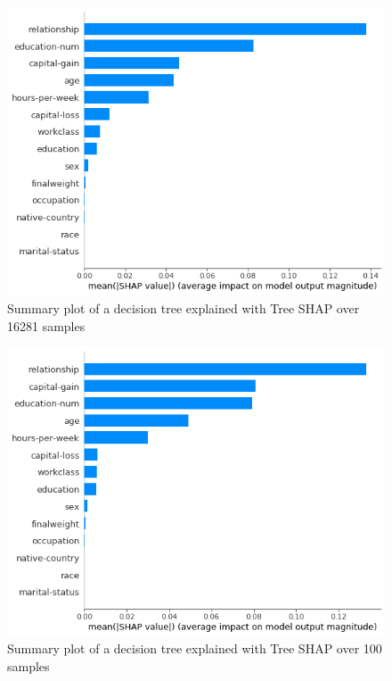 \documentclass[conference]{IEEEtran}
\begin{document}
\begin{figure}[htbp]
\centerline{
	\includegraphics[width=\linewidth]{../fig/ex_02_TreeShap_16281_Samples_SummaryPlot.png}
}
\caption{Summary plot of a decision tree explained with Tree SHAP over 16281 samples}
\label{fig5}
\end{figure}

\begin{figure}[htbp]
\centerline{
	\includegraphics[width=\linewidth]{../fig/ex_02_TreeShap_100_Samples_SummaryPlot.png}
}
\caption{Summary plot of a decision tree explained with Tree SHAP over 100 samples}
\label{fig6}
\end{figure}
\end{document}
